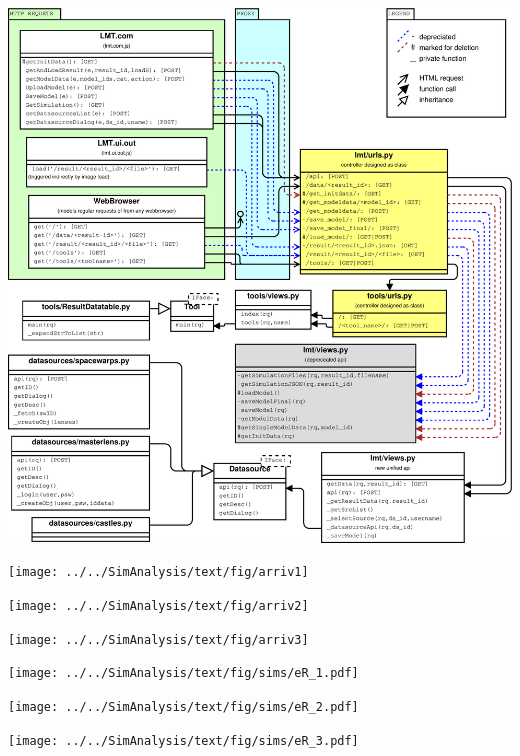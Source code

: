 \documentclass[aspectratio=1610]{beamer}
\begin{document}
\begin{frame}
  \includegraphics[height=\textheight]{../techdoc/uml/serverapi_full}
\end{frame}


\begin{frame}
  \texttt{[image: ../../SimAnalysis/text/fig/arriv1]}
\end{frame}
\begin{frame}
  \texttt{[image: ../../SimAnalysis/text/fig/arriv2]}
\end{frame}
\begin{frame}
  \texttt{[image: ../../SimAnalysis/text/fig/arriv3]}
\end{frame}


\begin{frame}
  \texttt{[image: ../../SimAnalysis/text/fig/sims/eR\_1.pdf]}
\end{frame}\begin{frame}
  \texttt{[image: ../../SimAnalysis/text/fig/sims/eR\_2.pdf]}
\end{frame}\begin{frame}
  \texttt{[image: ../../SimAnalysis/text/fig/sims/eR\_3.pdf]}
\end{frame}
\end{document}
